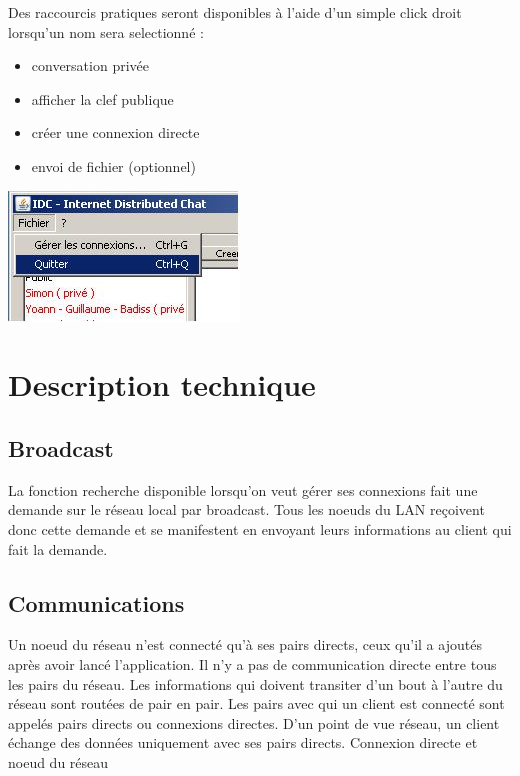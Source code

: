 \documentclass[french,11pt,a4]{article}
\begin{document}
Des raccourcis pratiques seront disponibles à l'aide d'un simple click droit lorsqu'un nom sera selectionné :

 \begin{itemize}

\item{conversation privée}

\item{afficher la clef publique}

\item{créer une connexion directe}

\item{envoi de fichier (optionnel)}

\end{itemize}

\begin{center}
\includegraphics{screenIHMmenu.jpg}
\end{center}
\section{Description technique}
\subsection{Broadcast}

La fonction recherche disponible lorsqu'on veut gérer ses connexions
fait une demande sur le réseau local par broadcast. Tous les noeuds du
LAN reçoivent donc cette demande et se manifestent en envoyant leurs
informations au client qui fait la demande.\\

\subsection{Communications}

Un noeud du réseau n'est connecté qu'à ses pairs directs, ceux qu'il a ajoutés après avoir lancé l'application. Il n'y a pas de communication directe entre tous les pairs du réseau. Les informations qui doivent transiter d'un bout à l'autre du réseau sont routées de pair en pair. Les pairs avec qui un client est connecté sont appelés pairs directs ou connexions directes. D'un point de vue réseau, un client échange des données uniquement avec ses pairs directs.
Connexion directe et noeud du réseau
\end{document}

